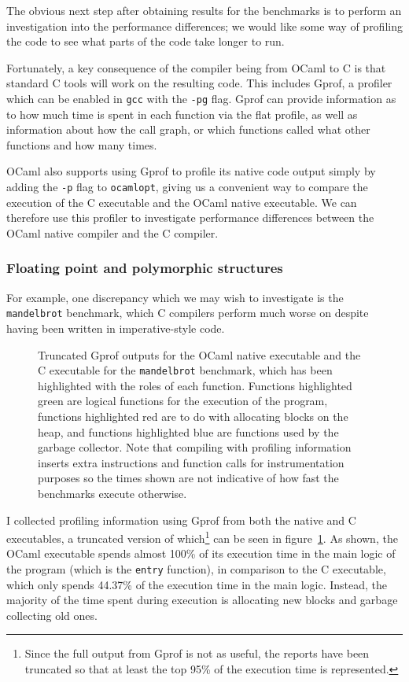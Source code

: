 The obvious next step after obtaining results for the benchmarks is to perform
an investigation into the performance differences; we would like some way of
profiling the code to see what parts of the code take longer to run.

Fortunately, a key consequence of the compiler being from OCaml to C is that
standard C tools will work on the resulting code. This includes Gprof, a
profiler which can be enabled in \texttt{gcc} with the \texttt{-pg} flag. Gprof
can provide information as to how much time is spent in each function via the
flat profile, as well as information about how the call graph, or which
functions called what other functions and how many times.

OCaml also supports using Gprof to profile its native code output simply by
adding the \texttt{-p} flag to \texttt{ocamlopt}, giving us a convenient way to
compare the execution of the C executable and the OCaml native executable. We
can therefore use this profiler to investigate performance differences between
the OCaml native compiler and the C compiler.

\subsubsection{Floating point and polymorphic structures} \label{float-alloc}

For example, one discrepancy which we may wish to investigate is the 
\texttt{mandelbrot} benchmark, which C compilers perform much worse on despite 
having been written in imperative-style code.

\begin{figure}
    \centering
    
    \caption{Truncated Gprof outputs for the OCaml native executable and the C
        executable for the \texttt{mandelbrot} benchmark, which has been
        highlighted with the roles of each function.  Functions highlighted
        green are logical functions for the execution of the program, functions
        highlighted red are to do with allocating blocks on the heap, and
        functions highlighted blue are functions used by the garbage collector.
        Note that compiling with profiling information inserts extra
        instructions and function calls for instrumentation purposes so the
        times shown are not indicative of how fast the benchmarks execute
        otherwise.}
    \label{fig:mandelbrot-gprof}
\end{figure}

I collected profiling information using Gprof from both the native and C
executables, a truncated version of which\footnote{Since the full output from
Gprof is not as useful, the reports have been truncated so that at least the top
95\% of the execution time is represented.} can be seen in
figure~\ref{fig:mandelbrot-gprof}. As shown, the OCaml executable spends almost
100\% of its execution time in the main logic of the program (which is the
\texttt{entry} function), in comparison to the C executable, which only spends
44.37\% of the execution time in the main logic. Instead, the majority of the
time spent during execution is allocating new blocks and garbage collecting old
ones.

